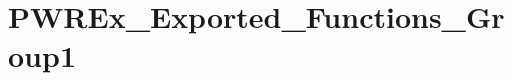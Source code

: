 \hypertarget{group___p_w_r_ex___exported___functions___group1}{}\section{P\+W\+R\+Ex\+\_\+\+Exported\+\_\+\+Functions\+\_\+\+Group1}
\label{group___p_w_r_ex___exported___functions___group1}

